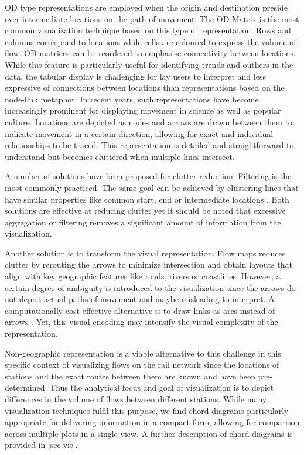 \documentclass{sig-alternate}
\begin{document}
OD type representations are employed when the origin and destination preside over intermediate locations on the path of movement. The OD Matrix is the most common visualization technique based on this type of representation. 
Rows and columns correspond to locations while cells are coloured to express the volume of flow.
OD matrices can be reordered to emphasise connectivity between locations.
While this feature is particularly useful for identifying trends and outliers in the data, the tabular display is challenging for lay users to interpret and less expressive of connections between locations than representations based on the node-link metaphor.
In recent years, such representations have become increasingly prominent for displaying movement in science as well as popular culture.
Locations are depicted as nodes and arrows are drawn between them to indicate movement in a certain direction, allowing for exact and individual relationships to be traced. 
This representation is detailed and straightforward to understand but becomes cluttered when multiple lines intersect. 

A number of solutions have been proposed for clutter reduction. 
Filtering is the most commonly practiced. 
The same goal can be achieved by clustering lines that have similar properties like common start, end or intermediate locations \cite{andrienko2007visual}. 
Both solutions are effective at reducing clutter yet it should be noted that excessive aggregation or filtering removes a significant amount of information from the visualization.

Another solution is to transform the visual representation. 
Flow maps \cite{phan2005flow} reduces clutter by rerouting the arrows to minimize intersection and obtain layouts that align with key geographic features like roads, rivers or coastlines. 
However, a certain degree of ambiguity is introduced to the visualization since the arrows do not depict actual paths of movement and maybe misleading to interpret.
A computationally cost effective alternative is to draw links as arcs instead of arrows \cite{chua2014flowsampler}.
Yet, this visual encoding may intensify the visual complexity of the representation.

Non-geographic representation is a viable alternative to this challenge in this specific context of visualizing flows on the rail network since the locations of stations and the exact routes between them are known and have been pre-determined. 
Thus the analytical focus and goal of visualization is to depict differences in the volume of flows between different stations. 
While many visualization techniques fulfil this purpose, we find chord diagrams \cite{krzywinski2009circos} particularly appropriate for delivering information in a compact form, allowing for comparison across multiple plots in a single view.
A further description of chord diagrams is provided in \cref{sec:vis}.
\end{document}
